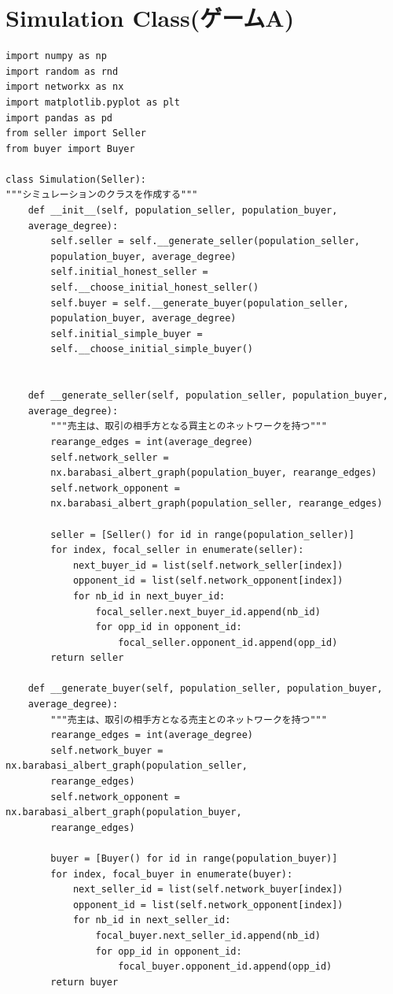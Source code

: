 \documentclass[a4paper,fontsize=11pt,report,notitlepage,line_length=38zw,number_of_lines=40,dvipdfmx]{jlreq}
\begin{document}
\section{Simulation Class(ゲームA)}
\begin{lstlisting}
import numpy as np
import random as rnd
import networkx as nx
import matplotlib.pyplot as plt
import pandas as pd
from seller import Seller
from buyer import Buyer

class Simulation(Seller):
"""シミュレーションのクラスを作成する"""    
    def __init__(self, population_seller, population_buyer,
    average_degree):
        self.seller = self.__generate_seller(population_seller,
        population_buyer, average_degree)
        self.initial_honest_seller =
        self.__choose_initial_honest_seller()
        self.buyer = self.__generate_buyer(population_seller,
        population_buyer, average_degree)
        self.initial_simple_buyer =
        self.__choose_initial_simple_buyer()
        

    def __generate_seller(self, population_seller, population_buyer,
    average_degree):
        """売主は、取引の相手方となる買主とのネットワークを持つ"""
        rearange_edges = int(average_degree)
        self.network_seller =
        nx.barabasi_albert_graph(population_buyer, rearange_edges)
        self.network_opponent =
        nx.barabasi_albert_graph(population_seller, rearange_edges)
        
        seller = [Seller() for id in range(population_seller)]
        for index, focal_seller in enumerate(seller):
            next_buyer_id = list(self.network_seller[index])
            opponent_id = list(self.network_opponent[index])
            for nb_id in next_buyer_id:
                focal_seller.next_buyer_id.append(nb_id)
                for opp_id in opponent_id:
                    focal_seller.opponent_id.append(opp_id)
        return seller

    def __generate_buyer(self, population_seller, population_buyer, 
    average_degree):
        """売主は、取引の相手方となる売主とのネットワークを持つ"""
        rearange_edges = int(average_degree)
        self.network_buyer = nx.barabasi_albert_graph(population_seller, 
        rearange_edges)
        self.network_opponent = nx.barabasi_albert_graph(population_buyer, 
        rearange_edges)

        buyer = [Buyer() for id in range(population_buyer)]
        for index, focal_buyer in enumerate(buyer):
            next_seller_id = list(self.network_buyer[index])
            opponent_id = list(self.network_opponent[index])
            for nb_id in next_seller_id:
                focal_buyer.next_seller_id.append(nb_id)
                for opp_id in opponent_id:
                    focal_buyer.opponent_id.append(opp_id)
        return buyer


\end{lstlisting}
\end{document}
